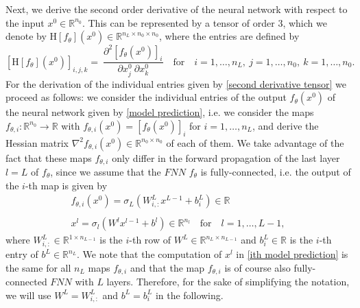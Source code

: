 Next, we derive the second order derivative of the neural network with respect to the input $x^0 \in \mathbb{R}^{n_0}$. This can be represented by a tensor of order $3$, which we denote by $\mathrm{H} \left[f_{\theta} \right]\left(x^0\right) \in \mathbb{R}^{n_L \times n_0 \times n_0}$, where the entries are defined by
\begin{equation}
    \label{second derivative tensor}
    \left[ \mathrm{H} \left[f_{\theta} \right]\left(x^0\right) \right]_{i,j,k} =\ \frac{\partial^2 \left[f_{\theta}\left(x^0\right)\right]_i}{\partial x^0_{j} \ \partial x^0_{k}} \quad \text{for} \quad i = 1,\ldots, n_L, \ j = 1,\ldots, n_0, \ k = 1,\ldots, n_0.
\end{equation}
For the derivation of the individual entries given by \cref{second derivative tensor} we proceed as follows: we consider the individual entries of the output $f_{\theta}\left(x^0\right)$ of the neural network given by \cref{model prediction}, i.e. we consider the maps $f_{\theta, i} \colon \mathbb{R}^{n_0} \to \mathbb{R}$ with $f_{\theta, i} \left( x^0 \right) = \left[ f_{\theta} (x^0) \right]_i$ for $i = 1, \ldots, n_L$, and derive the Hessian matrix $\nabla^2 f_{\theta, i} \left( x^0 \right) \in \mathbb{R}^{n_0 \times n_0}$ of each of them. We take advantage of the fact that these maps $f_{\theta, i}$ only differ in the forward propagation of the last layer $l = L$ of $f_{\theta}$, since we assume that the $FNN$ $f_{\theta}$ is fully-connected, i.e. the output of the $i$-th map is given by 
\begin{equation} 
    \label{ith model prediction}
    \begin{gathered}
        f_{\theta, i} \left( x^0 \right) = \sigma_L\left(W^L_{i,:} x^{L-1}  + b^{L}_{i} \right) \in \mathbb{R} \\
        \\
        x^l = \sigma_l\left(W^l x^{l-1} + b^l\right) \in \mathbb{R}^{n_l} \quad \text{for} \quad l = 1, \ldots, L-1,
    \end{gathered} 
\end{equation} 
where $W^L_{i,:} \in \mathbb{R}^{1 \times n_{L-1}}$ is the $i$-th row of $W^L \in \mathbb{R}^{n_L \times n_{L-1}}$ and $b^{L}_{i} \in \mathbb{R}$ is the $i$-th entry of $b^{L} \in \mathbb{R}^{n_L}$. We note that the computation of $x^l$ in \cref{ith model prediction} is the same for all $n_L$ maps $f_{\theta, i}$ and that the map $f_{\theta, i}$ is of course also fully-connected $FNN$ with $L$ layers. Therefore, for the sake of simplifying the notation, we will use $W^L = W^L_{i,:}$ and $b^{L} = b^{L}_{i}$ in the following.  \\
